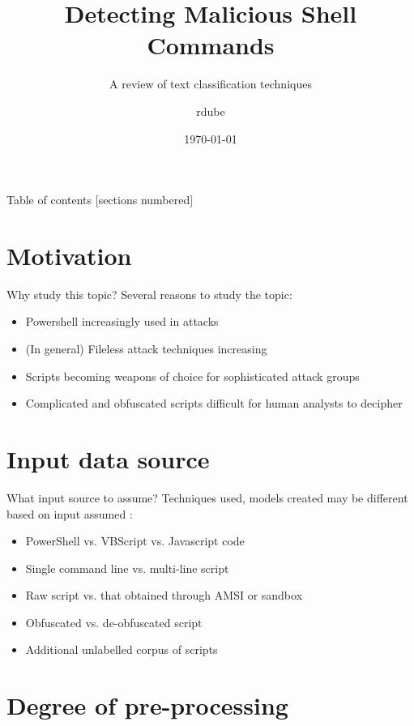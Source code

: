 \documentclass[10pt]{beamer}
\title{Detecting Malicious Shell Commands}
\subtitle{A review of text classification techniques}
\date{\today}
\author{rdube}
\begin{document}
\maketitle

\begin{frame}{Table of contents}
  [sections numbered]
  \tableofcontents[hideallsubsections]
\end{frame}

\section{Motivation}

\begin{frame}[fragile]{Why study this topic?}
	Several reasons to study the topic:
	\begin{itemize}
		\item Powershell increasingly used in attacks \cite{symc2016}
		\item (In general) Fileless attack techniques increasing \cite{symc2017}
		\item Scripts becoming weapons of choice for sophisticated attack groups \cite{msft2017-2}
		\item Complicated and obfuscated scripts difficult for human analysts to decipher \cite{feye2018}
	\end{itemize}
\end{frame}

\section{Input data source}

\begin{frame}{What input source to assume?}
	Techniques used, models created may be different based on input assumed \cite{msft2017-2,msft2019,feye2018}:
	\begin{itemize}
		\item PowerShell vs. VBScript vs. Javascript code 
		\item Single command line vs. multi-line script
		\item Raw script vs. that obtained through AMSI or sandbox
		\item Obfuscated vs. de-obfuscated script
		\item Additional unlabelled corpus of scripts
	\end{itemize}
\end{frame}

\section{Degree of pre-processing}
\end{document}
